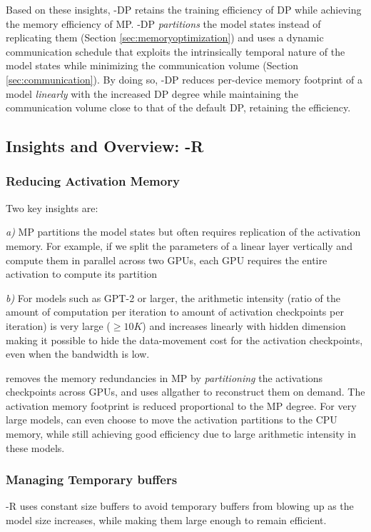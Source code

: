 Based on these insights, \name-DP retains the training efficiency of DP while achieving the memory efficiency of MP. \name-DP \emph{partitions} the model states instead of replicating them (Section \ref{sec:memoryoptimization}) and uses a dynamic communication schedule that exploits the intrinsically temporal nature of the model states while minimizing the communication volume (Section \ref{sec:communication}). By doing so, \name-DP reduces per-device memory footprint of a model \emph{linearly} with the increased DP degree while maintaining the communication volume close to that of the default DP, retaining the efficiency.
\subsection{Insights and Overview: \name-R}
\label{sec:mp_activation_replication}
\subsubsection{Reducing Activation Memory}
Two key insights are:

{\it a)} MP partitions the model states but often requires replication of the activation memory. For example, if we split the parameters of a linear layer vertically and compute them in parallel across two GPUs, each GPU requires the entire activation to compute its partition

{\it b)} For models such as GPT-2 or larger, the arithmetic intensity (ratio of the amount of computation per iteration to amount of activation checkpoints per iteration) is very large ($\ge 10K$) and increases linearly with hidden dimension making it possible to hide the data-movement cost for the activation checkpoints, even when the bandwidth is low.

\name removes the memory redundancies in MP by \emph{partitioning} the activations checkpoints across GPUs, and uses allgather to reconstruct them on demand. The activation memory footprint is reduced proportional to the MP degree. For very large models, \name can even choose to move the activation partitions to the CPU memory, while still achieving good efficiency due to large arithmetic intensity in these models. 
\subsubsection{Managing Temporary buffers}
\name-R uses constant size buffers to avoid temporary buffers from blowing up as the model size increases, while making them large enough to remain efficient. 

